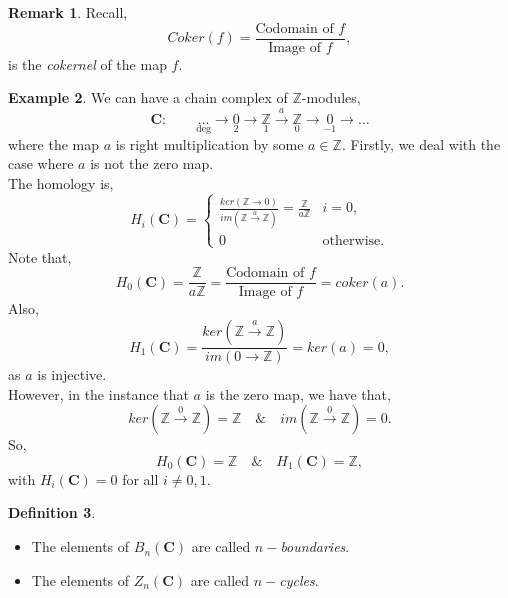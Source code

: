 \documentclass[11.5pt, twoside, a4paper, titlepage]{report}
\providecommand{\bb}[1]{\mathbb{#1}}
\theoremstyle{definition}
\newtheorem{mydef}{Definition}[section]
\newtheorem{rem}[mydef]{Remark}
\newtheorem{eg}[mydef]{Example}
\theoremstyle{plain}
\begin{document}
\begin{rem}
Recall, 
\begin{equation*}
Coker(f)= \frac{\text{Codomain of }f}{\text{Image of }f},
\end{equation*}
is the \emph{cokernel} of the map $f$.
\end{rem}

\begin{eg} \label{chainZeg}
We can have a chain complex of $\mathbb{Z}$-modules,
\begin{equation*}
\mathbf{C}: \qquad \underset{\text{deg}}{\dots} \xrightarrow{}\underset{2}{0} \xrightarrow{} \underset{1}{\mathbb{Z}} \xrightarrow{a}\underset{0}{\mathbb{Z}} \xrightarrow{} \underset{-1}{0} \xrightarrow{}\dots 
\end{equation*}
where the map $a$ is right multiplication by some $a \in \mathbb{Z}$. Firstly, we deal with the case where $a$ is not the zero map. \\
The homology is,
\begin{equation*}
H_i(\mathbf{C}) = 
\begin{cases}
\frac{ker(\mathbb{Z}\xrightarrow{} 0)}{im(\mathbb{Z}\xrightarrow{a}\mathbb{Z})}=\frac{\mathbb{Z}}{a\mathbb{Z}} & i=0,\\
0 & \text{otherwise}.
\end{cases}
\end{equation*}
Note that,
\begin{equation*}
H_0(\mathbf{C})=\frac{\bb{Z}}{a\bb{Z}}= \frac{\text{Codomain of }f}{\text{Image of }f}=coker(a).
\end{equation*}
Also,
\begin{equation*}
H_1(\mathbf{C})=\frac{ker(\bb{Z}\xrightarrow{a}\bb{Z})}{im(0\xrightarrow{}\bb{Z})}=ker(a)=0,
\end{equation*}
as $a$ is injective.\\
However, in the instance that $a$ is the zero map, we have that,
\begin{equation*}
ker(\bb{Z} \xrightarrow{0} \bb{Z})=\bb{Z} \quad \& \quad im(\bb{Z} \xrightarrow{0} \bb{Z})=0.
\end{equation*}
So,
\begin{equation*}
H_0(\mathbf{C})=\bb{Z} \quad \& \quad H_1(\mathbf{C})=\bb{Z},
\end{equation*}
with $H_i(\mathbf{C})=0$ for all $i \neq 0,1$.
\end{eg}

\begin{mydef}
\begin{itemize}
\item The elements of $B_n(\mathbf{C})$ are called \emph{$n-$boundaries}.
\item The elements of $Z_n(\mathbf{C})$ are called \emph{$n-$cycles}.
\end{itemize}
\end{mydef}
\end{document}
